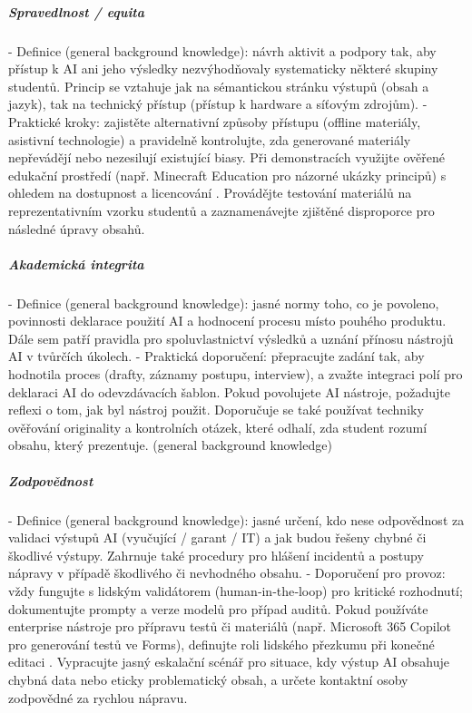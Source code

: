 \documentclass{report}%
\begin{document}
\subparagraph{Spravedlnost / equita}
- Definice (general background knowledge): návrh aktivit a podpory tak, aby přístup k AI ani jeho výsledky nezvýhodňovaly systematicky některé skupiny studentů. Princip se vztahuje jak na sémantickou stránku výstupů (obsah a jazyk), tak na technický přístup (přístup k hardware a síťovým zdrojům).
- Praktické kroky: zajistěte alternativní způsoby přístupu (offline materiály, asistivní technologie) a pravidelně kontrolujte, zda generované materiály nepřevádějí nebo nezesilují existující biasy. Při demonstracích využijte ověřené edukační prostředí (např. Minecraft Education pro názorné ukázky principů) s ohledem na dostupnost a licencování \cite{kb_ai_101_tipu_pdf_04e4a115_page_15_2}. Provádějte testování materiálů na reprezentativním vzorku studentů a zaznamenávejte zjištěné disproporce pro následné úpravy obsahů.

\subparagraph{Akademická integrita}
- Definice (general background knowledge): jasné normy toho, co je povoleno, povinnosti deklarace použití AI a hodnocení procesu místo pouhého produktu. Dále sem patří pravidla pro spoluvlastnictví výsledků a uznání přínosu nástrojů AI v tvůrčích úkolech.
- Praktická doporučení: přepracujte zadání tak, aby hodnotila proces (drafty, záznamy postupu, interview), a zvažte integraci polí pro deklaraci AI do odevzdávacích šablon. Pokud povolujete AI nástroje, požadujte reflexi o tom, jak byl nástroj použit. Doporučuje se také používat techniky ověřování originality a kontrolních otázek, které odhalí, zda student rozumí obsahu, který prezentuje. (general background knowledge)

\subparagraph{Zodpovědnost}
- Definice (general background knowledge): jasné určení, kdo nese odpovědnost za validaci výstupů AI (vyučující / garant / IT) a jak budou řešeny chybné či škodlivé výstupy. Zahrnuje také procedury pro hlášení incidentů a postupy nápravy v případě škodlivého či nevhodného obsahu.
- Doporučení pro provoz: vždy fungujte s lidským validátorem (human‑in‑the‑loop) pro kritické rozhodnutí; dokumentujte prompty a verze modelů pro případ auditů. Pokud používáte enterprise nástroje pro přípravu testů či materiálů (např. Microsoft 365 Copilot pro generování testů ve Forms), definujte roli lidského přezkumu při konečné editaci \cite{kb_ai_101_tipu_pdf_04e4a115_page_36_1}. Vypracujte jasný eskalační scénář pro situace, kdy výstup AI obsahuje chybná data nebo eticky problematický obsah, a určete kontaktní osoby zodpovědné za rychlou nápravu.
\end{document}
